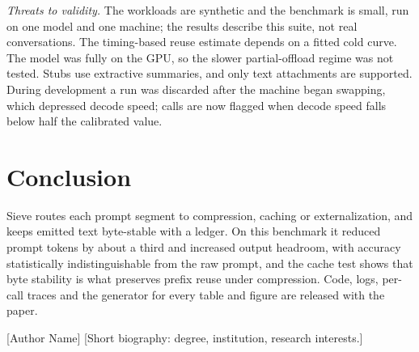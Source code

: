 \documentclass[journal]{IEEEtran}
\begin{document}
\textit{Threats to validity.} The workloads are synthetic and the benchmark is small, run on one model and one machine; the results describe this
suite, not real conversations. The timing-based reuse estimate depends on a fitted cold curve. The model was fully on the GPU, so the slower
partial-offload regime was not tested. Stubs use extractive summaries, and only text attachments are supported. During development a run
was discarded after the machine began swapping, which depressed decode speed; calls are now flagged when decode speed falls below half the
calibrated value.

\section{Conclusion}
Sieve routes each prompt segment to compression, caching or externalization, and keeps emitted text byte-stable with a ledger. On this
benchmark it reduced prompt tokens by about a third and
increased output headroom, with accuracy statistically indistinguishable from the raw prompt, and the cache test shows that byte stability is what preserves prefix
reuse under compression. Code, logs, per-call traces and the generator for every table and figure are released with the paper.




\begin{IEEEbiographynophoto}{[Author Name]}
[Short biography: degree, institution, research interests.]
\end{IEEEbiographynophoto}
\end{document}
